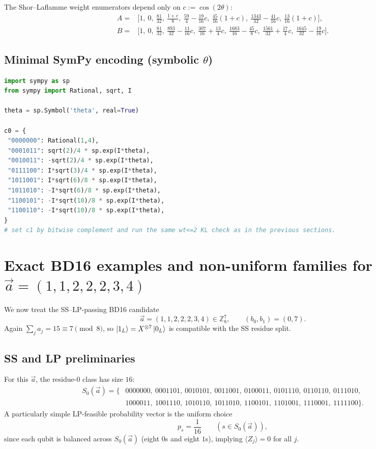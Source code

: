 \documentclass[11pt]{article}
\begin{document}
The Shor--Laflamme weight enumerators depend only on \(c:=\cos(2\theta)\):
\[
\begin{aligned}
A=&\Big[
1,\ 0,\ \frac{81}{32},\ \frac{1+c}{8},\ \frac{59}{4}-\frac{19}{16}c,\ \frac{45}{16}(1+c),\ \frac{1343}{32}-\frac{41}{16}c,\ \frac{13}{16}(1+c)
\Big],\\[2pt]
B=&\Big[
1,\ 0,\ \frac{81}{32},\ \frac{893}{32}-\frac{11}{16}c,\ \frac{307}{16}+\frac{13}{4}c,\ \frac{1683}{16}-\frac{45}{8}c,\ \frac{1561}{32}+\frac{17}{4}c,\ \frac{1645}{32}-\frac{19}{16}c
\Big].
\end{aligned}
\]

\subsection{Minimal SymPy encoding (symbolic \texorpdfstring{$\theta$}{theta})}

\begin{lstlisting}[language=Python]
import sympy as sp
from sympy import Rational, sqrt, I

theta = sp.Symbol('theta', real=True)

c0 = {
 "0000000": Rational(1,4),
 "0001011": sqrt(2)/4 * sp.exp(I*theta),
 "0010011": -sqrt(2)/4 * sp.exp(I*theta),
 "0111100": I*sqrt(3)/4 * sp.exp(I*theta),
 "1011001": I*sqrt(6)/8 * sp.exp(I*theta),
 "1011010": -I*sqrt(6)/8 * sp.exp(I*theta),
 "1100101": -I*sqrt(10)/8 * sp.exp(I*theta),
 "1100110": -I*sqrt(10)/8 * sp.exp(I*theta),
}
# set c1 by bitwise complement and run the same wt<=2 KL check as in the previous sections.
\end{lstlisting}

\section{Exact BD16 examples and non-uniform families for \texorpdfstring{$\vec a=(1,1,2,2,2,3,4)$}{a=(1,1,2,2,2,3,4)}}
\label{sec:bd16_1122234}

We now treat the SS--LP-passing BD16 candidate
\[
\vec a=(1,1,2,2,2,3,4)\in\mathbb{Z}_8^7,\qquad (b_0,b_1)=(0,7).
\]
Again \(\sum_j a_j=15\equiv 7\pmod 8\), so \(\ket{1_L}=X^{\otimes 7}\ket{0_L}\) is compatible with the SS residue split.

\subsection{SS and LP preliminaries}

For this \(\vec a\), the residue-\(0\) class has size \(16\):
\[
\begin{aligned}
S_0(\vec a)=\{&
0000000,\ 0001101,\ 0010101,\ 0011001,\ 0100011,\ 0101110,\ 0110110,\ 0111010,\\
&1000011,\ 1001110,\ 1010110,\ 1011010,\ 1100101,\ 1101001,\ 1110001,\ 1111100
\}.
\end{aligned}
\]
A particularly simple LP-feasible probability vector is the uniform choice
\[
p_s=\frac{1}{16}\qquad (s\in S_0(\vec a)),
\]
since each qubit is balanced across \(S_0(\vec a)\) (eight \(0\)s and eight \(1\)s), implying \(\langle Z_j\rangle=0\) for all \(j\).
\end{document}
